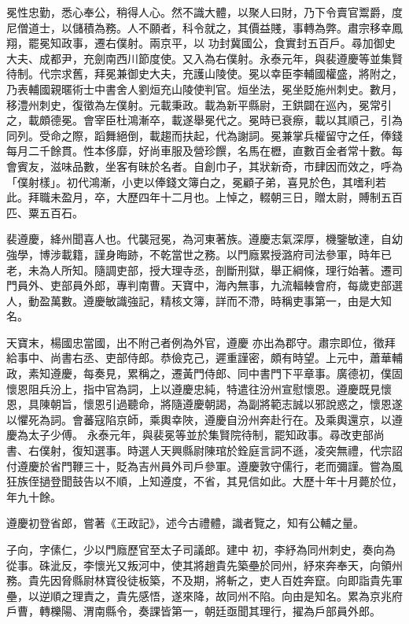\begin{pinyinscope}
 冕性忠勤，悉心奉公，稍得人心。然不識大體，以聚人曰財，乃下令賣官鬻爵，度尼僧道士，以儲積為務。人不願者，科令就之，其價益賤，事轉為弊。肅宗移幸鳳翔，罷冕知政事，遷右僕射。兩京平，以
 功封冀國公，食實封五百戶。尋加御史大夫、成都尹，充劍南西川節度使。又入為右僕射。永泰元年，與裴遵慶等並集賢待制。代宗求舊，拜冕兼御史大夫，充護山陵使。冕以幸臣李輔國權盛，將附之，乃表輔國親暱術士中書舍人劉烜充山陵使判官。烜坐法，冕坐貶施州刺史。數月，移澧州刺史，復徵為左僕射。元載秉政。載為新平縣尉，王鉷闢在巡內，冕常引之，載頗德冕。會宰臣杜鴻漸卒，載遂舉冕代之。冕時已衰瘵，載以其順己，引為
 同列。受命之際，蹈舞絕倒，載趨而扶起，代為謝詞。冕兼掌兵權留守之任，俸錢每月二千餘貫。性本侈靡，好尚車服及營珍饌，名馬在櫪，直數百金者常十數。每會賓友，滋味品數，坐客有昧於名者。自創巾子，其狀新奇，市肆因而效之，呼為「僕射樣」。初代鴻漸，小吏以俸錢文簿白之，冕顧子弟，喜見於色，其嗜利若此。拜職未盈月，卒，大歷四年十二月也。上悼之，輟朝三日，贈太尉，賻制五百匹、粟五百石。



 裴遵慶，絳州聞喜人也。代襲冠冕，為河東著族。遵慶志氣深厚，機鑒敏達，自幼強學，博涉載籍，謹身晦跡，不乾當世之務。以門廕累授潞府司法參軍，時年已老，未為人所知。隨調吏部，授大理寺丞，剖斷刑獄，舉正綱條，理行始著。遷司門員外、吏部員外郎，專判南曹。天寶中，海內無事，九流輻輳會府，每歲吏部選人，動盈萬數。遵慶敏識強記，精核文簿，詳而不滯，時稱吏事第一，由是大知名。



 天寶末，楊國忠當國，出不附己者例為外官，遵慶
 亦出為郡守。肅宗即位，徵拜給事中、尚書右丞、吏部侍郎。恭儉克己，遲重謹密，頗有時望。上元中，蕭華輔政，素知遵慶，每奏見，累稱之，遷黃門侍郎、同中書門下平章事。廣德初，僕固懷恩阻兵汾上，指中官為詞，上以遵慶忠純，特遣往汾州宣慰懷恩。遵慶既見懷恩，具陳朝旨，懷恩引過聽命，將隨遵慶朝謁，為副將範志誠以邪說惑之，懷恩遂以懼死為詞。會蕃寇陷京師，乘輿幸陜，遵慶自汾州奔赴行在。及乘輿還京，以遵慶為太子少傅。
 永泰元年，與裴冕等並於集賢院待制，罷知政事。尋改吏部尚書、右僕射，復知選事。時選人天興縣尉陳琯於銓庭言詞不遜，凌突無禮，代宗詔付遵慶於省門鞭三十，貶為吉州員外司戶參軍。遵慶敦守儒行，老而彌謹。嘗為風狂族侄撾登聞鼓告以不順，上知遵度，不省，其見信如此。大歷十年十月薨於位，年九十餘。



 遵慶初登省郎，嘗著《王政記》，述今古禮體，識者覽之，知有公輔之量。



 子向，字傃仁，少以門廕歷官至太子司議郎。建中
 初，李紓為同州刺史，奏向為從事。硃泚反，李懷光又叛河中，使其將趙貴先築壘於同州，紓來奔奉天，向領州務。貴先因脅縣尉林寶役徒板築，不及期，將斬之，吏人百姓奔竄。向即詣貴先軍壘，以逆順之理責之，貴先感悟，遂來降，故同州不陷。向由是知名。累為京兆府戶曹，轉櫟陽、渭南縣令，奏課皆第一，朝廷亟聞其理行，擢為戶部員外郎。




\end{pinyinscope}
